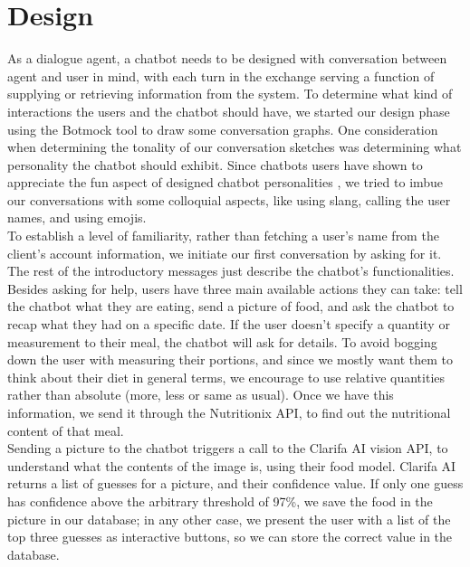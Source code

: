 \section{Design}
As a dialogue agent, a chatbot needs to be designed with conversation between agent and user in mind, with each turn in the exchange serving a function of supplying or retrieving information from the system.
To determine what kind of interactions the users and the chatbot should have, we started our design phase using the Botmock tool to draw some conversation graphs.
One consideration when determining the tonality of our conversation sketches was determining what personality the chatbot should exhibit. Since chatbots users have shown to appreciate the fun aspect of designed chatbot personalities \cite{10.1007/978-3-319-67744-6_28}, we tried to imbue our conversations with some colloquial aspects, like using slang, calling the user names, and using emojis. \\
To establish a level of familiarity, rather than fetching a user's name from the client's account information, we initiate our first conversation by asking for it. The rest of the introductory messages just describe the chatbot's functionalities.
Besides asking for help, users have three main available actions they can take: tell the chatbot what they are eating, send a picture of food, and ask the chatbot to recap what they had on a specific date. If the user doesn't specify a quantity or measurement to their meal, the chatbot will ask for details. To avoid bogging down the user with measuring their portions, and since we mostly want them to think about their diet in general terms, we encourage to use relative quantities rather than absolute (more, less or same as usual). Once we have this information, we send it through the Nutritionix API, to find out the nutritional content of that meal. \\
Sending a picture to the chatbot triggers a call to the Clarifa AI vision API, to understand what the contents of the image is, using their food model. Clarifa AI returns a list of guesses for a picture, and their confidence value. If only one guess has confidence above the arbitrary threshold of 97\%, we save the food in the picture in our database; in any other case, we present the user with a list of the top three guesses as interactive buttons, so we can store the correct value in the database. \\
